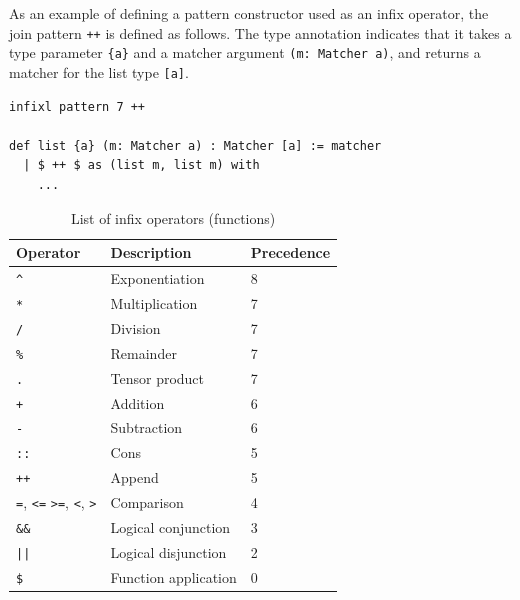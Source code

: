 As an example of defining a pattern constructor used as an infix operator, the join pattern \lstinline{++} is defined as follows.
The type annotation indicates that it takes a type parameter \lstinline|{a}| and a matcher argument \lstinline|(m: Matcher a)|, and returns a matcher for the list type \lstinline|[a]|.
\begin{lstlisting}[language=egison,numbers=none]
infixl pattern 7 ++

def list {a} (m: Matcher a) : Matcher [a] := matcher
  | $ ++ $ as (list m, list m) with
    ...
\end{lstlisting}

\begin{table}[h]
\begin{center}
    \begin{tabular}{ | l | l | l |}
    \hline
    Operator & Description & Precedence \\ \hline
    \texttt{\^} & Exponentiation & 8 \\ \hline
    \texttt{*} & Multiplication & 7 \\ \hline
    \texttt{/} & Division & 7 \\ \hline
    \texttt{\%} & Remainder & 7 \\ \hline
    \texttt{.} & Tensor product & 7 \\ \hline
    \texttt{+} & Addition & 6 \\ \hline
    \texttt{-} & Subtraction & 6 \\ \hline
    \texttt{::} & Cons & 5 \\ \hline
    \texttt{++} & Append & 5 \\ \hline
    \texttt{=}, \texttt{<=} \texttt{>=}, \texttt{<}, \texttt{>} & Comparison & 4 \\ \hline
    \texttt{\&\&} & Logical conjunction & 3 \\ \hline
    \texttt{||} & Logical disjunction & 2 \\ \hline
    \texttt{\$} & Function application & 0 \\ \hline
    \end{tabular}
\end{center}
    \caption{List of infix operators (functions)}
    \label{tab:infixFunctions}
\end{table}

